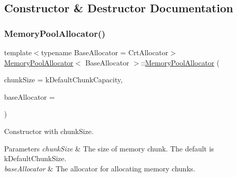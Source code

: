 \subsection{Constructor \& Destructor Documentation}
\mbox{\label{a01984_aeec85ac657f242ac5620115141be5209}} 
\subsubsection{\texorpdfstring{Memory\+Pool\+Allocator()}{MemoryPoolAllocator()}\hspace{0.1cm}{\footnotesize\ttfamily [1/2]}}
{\footnotesize\ttfamily template$<$typename Base\+Allocator = Crt\+Allocator$>$ \\
\hyperlink{a01984}{Memory\+Pool\+Allocator}$<$ Base\+Allocator $>$\+::\hyperlink{a01984}{Memory\+Pool\+Allocator} (\begin{DoxyParamCaption}\item[{size\+\_\+t}]{chunk\+Size = {\ttfamily kDefaultChunkCapacity},  }\item[{Base\+Allocator $\ast$}]{base\+Allocator = {} }\end{DoxyParamCaption})\hspace{0.3cm}{\ttfamily [inline]}}



Constructor with chunk\+Size. 


\begin{DoxyParams}{Parameters}
{\em chunk\+Size} & The size of memory chunk. The default is k\+Default\+Chunk\+Size. \\
\hline
{\em base\+Allocator} & The allocator for allocating memory chunks. \\
\hline
\end{DoxyParams}
\mbox{\label{a01984_a1f0d865093fdb955d956b7a445a8ddbf}} 
